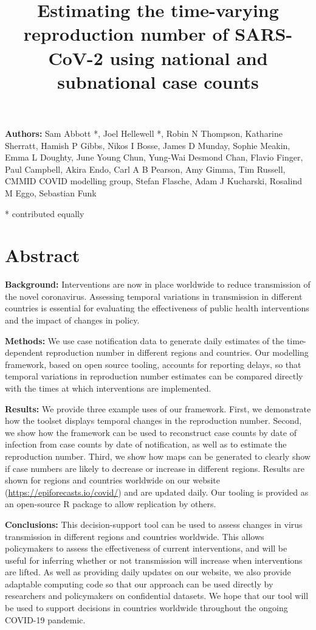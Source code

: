 \documentclass[
]{article}
\title{Estimating the time-varying reproduction number of SARS-CoV-2 using
national and subnational case counts}
\author{}
\date{\vspace{-2.5em}}
\begin{document}
\maketitle

\textbf{Authors:} Sam Abbott *, Joel Hellewell *, Robin N Thompson,
Katharine Sherratt, Hamish P Gibbs, Nikos I Bosse, James D Munday,
Sophie Meakin, Emma L Doughty, June Young Chun, Yung-Wai Desmond Chan,
Flavio Finger, Paul Campbell, Akira Endo, Carl A B Pearson, Amy Gimma,
Tim Russell, CMMID COVID modelling group, Stefan Flasche, Adam J
Kucharski, Rosalind M Eggo, Sebastian Funk

* contributed equally

\hypertarget{abstract}{%
\section{Abstract}\label{abstract}}

\textbf{Background:} Interventions are now in place worldwide to reduce
transmission of the novel coronavirus. Assessing temporal variations in
transmission in different countries is essential for evaluating the
effectiveness of public health interventions and the impact of changes
in policy.

\textbf{Methods:} We use case notification data to generate daily
estimates of the time-dependent reproduction number in different regions
and countries. Our modelling framework, based on open source tooling,
accounts for reporting delays, so that temporal variations in
reproduction number estimates can be compared directly with the times at
which interventions are implemented.

\textbf{Results:} We provide three example uses of our framework. First,
we demonstrate how the toolset displays temporal changes in the
reproduction number. Second, we show how the framework can be used to
reconstruct case counts by date of infection from case counts by date of
notification, as well as to estimate the reproduction number. Third, we
show how maps can be generated to clearly show if case numbers are
likely to decrease or increase in different regions. Results are shown
for regions and countries worldwide on our website
(\url{https://epiforecasts.io/covid/}) and are updated daily. Our
tooling is provided as an open-source R package to allow replication by
others.

\textbf{Conclusions:} This decision-support tool can be used to assess
changes in virus transmission in different regions and countries
worldwide. This allows policymakers to assess the effectiveness of
current interventions, and will be useful for inferring whether or not
transmission will increase when interventions are lifted. As well as
providing daily updates on our website, we also provide adaptable
computing code so that our approach can be used directly by researchers
and policymakers on confidential datasets. We hope that our tool will be
used to support decisions in countries worldwide throughout the ongoing
COVID-19 pandemic.
\end{document}

